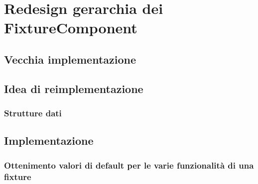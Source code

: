 \documentclass[main.tex]{subfiles}
\begin{document}
\sloppy


\vspace{1.0cm}

\section{Redesign gerarchia dei FixtureComponent}\label{sec:FixtureComponentHierachy}

\subsection{Vecchia implementazione}\label{subsec:3_oldImplementation}

\subsection{Idea di reimplementazione}\label{subsec:3_idea}
\subsubsection{Strutture dati}\label{subsec:3_2_structs}

\subsection{Implementazione}\label{subsec:3_implementation}
\subsubsection{Ottenimento valori di default per le varie funzionalità di una fixture}\label{subsec:3_1_defaultValues}
\end{document}
